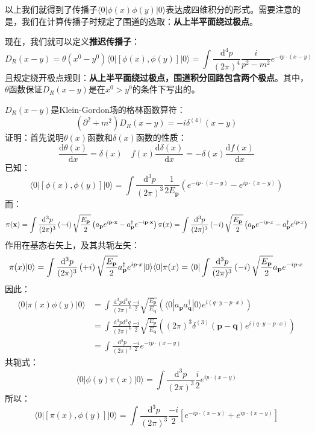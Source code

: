 \documentclass{book}
\begin{document}
以上我们就得到了传播子$\langle0|\phi(x)\phi(y)|0\rangle$表达成四维积分的形式。需要注意的是，我们在计算传播子时规定了围道的选取：\textbf{从上半平面绕过极点}。

现在，我们就可以定义\textbf{推迟传播子}：
$$
D_R(x-y)=\theta(x^0-y^0)\langle0|\left[\phi(x),\phi(y)\right]|0\rangle=\int\frac{\mathrm{d}^4p}{(2\pi)^4}\frac{i}{p^2-m^2}e^{-ip\cdot(x-y)}
$$
且规定绕开极点规则：\textbf{从上半平面绕过极点，围道积分回路包含两个极点}。其中，$\theta$函数保证$D_R(x-y)$是在$x^0>y^0$的条件下写出的。

$D_R(x-y)$是Klein-Gordon场的格林函数算符：
$$
(\partial^2+m^2)D_R(x-y)=-i\delta^{(4)}(x-y)
$$
证明：首先说明$\theta(x)$函数和$\delta(x)$函数的性质：
$$
\frac{\mathrm{d}\theta(x)}{\mathrm{d}x}=\delta(x)\quad f(x)\frac{\mathrm{d}\delta(x)}{\mathrm{d}x}=-\delta(x)\frac{\mathrm{d}f(x)}{\mathrm{d}x}
$$
已知：
$$
\langle 0|[\phi(x),\phi(y)]|0\rangle=\int\frac{\mathrm{d}^3p}{(2\pi)^3}\frac1{2E_\mathbf{p}}(e^{-ip\cdot(x-y)}-e^{ip\cdot(x-y)})
$$
而：
$$
\pi(\mathbf{x})=\int\frac{\mathrm{d}^3p}{(2\pi)^3}\left(-{i}\right)\sqrt{\frac{E_{\mathbf{p}}}2}\left(a_{\mathbf{p}}{e}^{{i}\mathbf{p}\cdot\mathbf{x}}-a_{\mathbf{p}}^{\dagger}{e}^{-{i}\mathbf{p}\cdot\mathbf{x}}\right) \\
\pi(x)=\int\frac{\mathrm{d}^3p}{(2\pi)^3}\left(-{i}\right)\sqrt{\frac{E_{\mathbf{p}}}2}\left(a_{\mathbf{p}}{e}^{-ip\cdot x}-a_{\mathbf{p}}^{\dagger}{e}^{ip\cdot x}\right)
$$
作用在基态右矢上，及其共轭左矢：
$$
\pi(x)|0\rangle=\int\frac{\mathrm{d}^3p}{(2\pi)^3}\left(+{i}\right)\sqrt{\frac{E_{\mathbf{p}}}2}a_{\mathbf{p}}^{\dagger}{e}^{ip\cdot x}|0\rangle \\
\langle 0|\pi(x)=\langle 0|\int\frac{\mathrm{d}^3p}{(2\pi)^3}\left(-{i}\right)\sqrt{\frac{E_{\mathbf{p}}}2}a_{\mathbf{p}}{e}^{-ip\cdot x}
$$
因此：
$$
\begin{aligned}
\langle 0|\pi(x)\phi(y)|0\rangle&=\int\frac{\mathrm{d}^3p\mathrm{d}^3q}{(2\pi)^6}\frac{-i}{2}\sqrt{\frac{E_\mathbf{p}}{E_\mathbf{q}}}(\langle0|a_\mathbf{p}a_\mathbf{q}^\dagger|0\rangle e^{i(q\cdot y-p\cdot x)} ) \\
&=\int\frac{\mathrm{d}^3p\mathrm{d}^3q}{(2\pi)^6}\frac{-i}{2}\sqrt{\frac{E_\mathbf{p}}{E_\mathbf{q}}}((2\pi)^3\delta^{(3)}(\mathbf{p}-\mathbf{q}) e^{i(q\cdot y-p\cdot x)} ) \\
&=\int\frac{\mathrm{d}^3p}{(2\pi)^3}\frac{-i}{2}e^{-ip\cdot(x-y)}
\end{aligned}
$$
共轭式：
$$
\langle0|\phi(y)\pi(x)|0\rangle=\int\frac{\mathrm{d}^3p}{(2\pi)^3}\frac{i}{2}e^{ip\cdot(x-y)}
$$
所以：
$$
\langle0|[\pi(x),\phi(y)]|0\rangle=\int\frac{\mathrm{d}^3p}{(2\pi)^3}\frac{-i}{2}[e^{-ip\cdot(x-y)}+e^{ip\cdot(x-y)}]
$$
\end{document}
